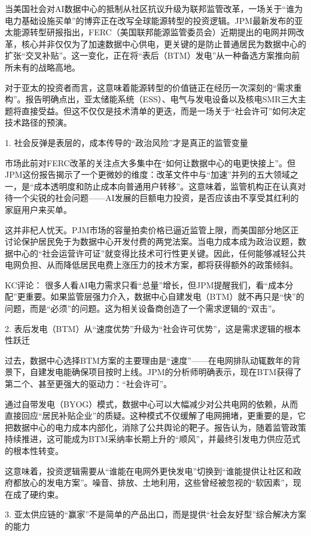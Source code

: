 \documentclass[11pt]{ctexart}
\begin{document}
当美国社会对AI数据中心的抵制从社区抗议升级为联邦监管改革，一场关于“谁为电力基础设施买单”的博弈正在改写全球能源转型的投资逻辑。JPM最新发布的亚太能源转型研报指出，FERC（美国联邦能源监管委员会）近期提出的电网并网改革，核心并非仅仅为了加速数据中心供电，更关键的是防止普通居民为数据中心的扩张“交叉补贴”。这一变化，正在将“表后（BTM）发电”从一种备选方案推向前所未有的战略高地。

对于亚太的投资者而言，这意味着能源转型的价值链正在经历一次深刻的“需求重构”。报告明确点出，亚太储能系统（ESS）、电气与发电设备以及核电SMR三大主题将直接受益。但这不仅仅是技术清单的更迭，而是一场关于“社会许可”如何决定技术路径的预演。

1. 社会反弹是表层的，成本传导的“政治风险”才是真正的监管变量

市场此前对FERC改革的关注点大多集中在“如何让数据中心的电更快接上”。但JPM这份报告揭示了一个更微妙的维度：改革文件中与“加速”并列的五大领域之一，是“成本透明度和防止成本向普通用户转移”。这意味着，监管机构正在认真对待一个尖锐的社会问题——AI发展的巨额电力投资，是否应该由不享受其红利的家庭用户来买单。

这并非杞人忧天。PJM市场的容量拍卖价格已逼近监管上限，而美国部分地区正讨论保护居民免于为数据中心开发付费的两党法案。当电力成本成为政治议题，数据中心的“社会运营许可证”就变得比技术可行性更关键。因此，任何能够减轻公共电网负担、从而降低居民电费上涨压力的技术方案，都将获得额外的政策倾斜。

KC评论： 很多人看AI电力需求只看“总量”增长，但JPM提醒我们，看“成本分配”更重要。如果监管层强力介入，数据中心自建发电（BTM）就不再只是“快”的问题，而是“必须”的问题。这为相关设备商创造了一个需求逻辑的“双击”。

2. 表后发电（BTM）从“速度优势”升级为“社会许可优势”，这是需求逻辑的根本性跃迁

过去，数据中心选择BTM方案的主要理由是“速度”——在电网排队动辄数年的背景下，自建发电能确保项目按时上线。JPM的分析师明确表示，现在BTM获得了第二个、甚至更强大的驱动力：“社会许可”。

通过自带发电（BYOG）模式，数据中心可以大幅减少对公共电网的依赖，从而直接回应“居民补贴企业”的质疑。这种模式不仅缓解了电网拥堵，更重要的是，它把数据中心的电力成本内部化，消除了公共舆论的靶子。报告认为，随着监管政策持续推进，这可能成为BTM采纳率长期上升的“顺风”，并最终引发电力供应范式的根本性转变。

这意味着，投资逻辑需要从“谁能在电网外更快发电”切换到“谁能提供让社区和政府都放心的发电方案”。噪音、排放、土地利用，这些曾经被忽视的“软因素”，现在成了硬约束。

3. 亚太供应链的“赢家”不是简单的产品出口，而是提供“社会友好型”综合解决方案的能力
\end{document}
